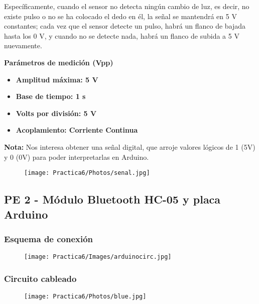 \documentclass[12pt]{article}
\begin{document}
    Específicamente, cuando el sensor no detecta ningún cambio de luz, es decir, no existe pulso o no se ha colocado el dedo en él, la señal se mantendrá en 5 V constantes; cada vez que el sensor detecte un pulso, habrá un flanco de bajada hasta los 0 V, y cuando no se detecte nada, habrá un flanco de subida a 5 V nuevamente.
    
    \textbf{Parámetros de medición (Vpp)}
            \begin{multicols}{2}
                \begin{itemize}
                    \item[\checkmark] \textbf{Amplitud máxima: 5 V}
                
                    \item[\checkmark] \textbf{Base de tiempo: 1 s}
            \columnbreak
                    \item[\checkmark] \textbf{Volts por división: 5 V}
                    \item[\checkmark] \textbf{Acoplamiento: Corriente Continua}
                \end{itemize}
            \end{multicols}
    
    \textbf{Nota:} Nos interesa obtener una señal digital, que arroje valores lógicos de 1 (5V) y 0 (0V) para poder interpretarlas en Arduino. 
         
            \begin{figure}[h!]
                \centering
                \texttt{[image: Practica6/Photos/senal.jpg]}
            \end{figure}
    
    
    \newpage
    \subsection{PE 2 - Módulo Bluetooth HC-05 y placa Arduino}
    \subsubsection{Esquema de conexión}
    \begin{figure}[h!]
                \centering
                \texttt{[image: Practica6/Images/arduinocirc.jpg]}
    \end{figure}
    
    \subsubsection{Circuito cableado}
    \begin{figure}[h!]
                \centering
                \texttt{[image: Practica6/Photos/blue.jpg]}
    \end{figure}
    
\end{document}
